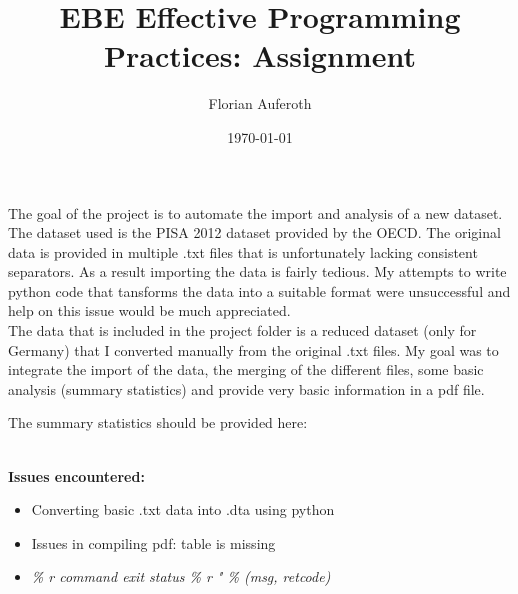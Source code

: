 \documentclass[11pt, a4paper, leqno]{article}
\begin{document}
\title{EBE Effective Programming Practices: Assignment
}

\author{Florian Auferoth
}

\date{
\today
}

\maketitle


The goal of the project is to automate the import and analysis of a new dataset. The dataset used is the PISA 2012 dataset provided by the OECD. The original data is provided in multiple .txt files that is unfortunately lacking consistent separators. As a result importing the data is fairly tedious. My attempts to write python code that tansforms the data into a suitable format were unsuccessful and help on this issue would be much appreciated. \\ 
The data that is included in the project folder is a reduced dataset (only for Germany) that I converted manually from the original .txt files. My goal was to integrate the import of the data, the merging of the different files, some basic analysis (summary statistics) and provide very basic information in a pdf file. 

 \medskip
The summary statistics should be provided here:\\

\\
\medskip

\textbf{Issues encountered:}
\begin{itemize}
\item Converting basic .txt data into .dta using python
\item Issues in compiling pdf: table is missing
\item \textit{\% r command exit status \% r " \% (msg, retcode)}
\end{itemize}

\end{document}
